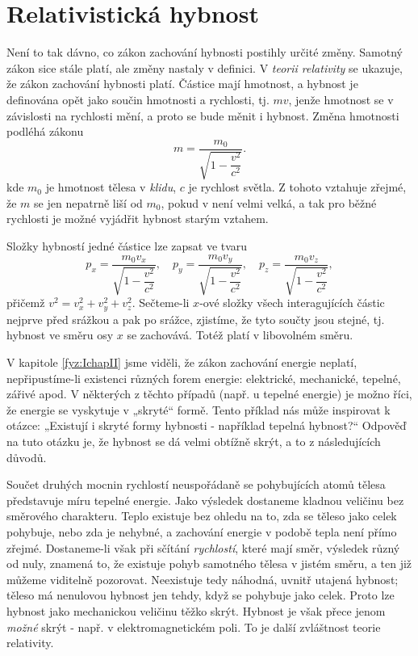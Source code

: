   \section{Relativistická hybnost}
    Není to tak dávno, co zákon zachování hybnosti postihly určité změny. Samotný zákon sice stále 
    platí, ale změny nastaly v definici. V \emph{teorii relativity} se ukazuje, že zákon zachování 
    hybnosti platí. Částice mají hmotnost, a hybnost je definována opět jako součin hmotnosti a 
    rychlosti, tj. \(mv\), jenže hmotnost se v závislosti na rychlosti mění, a proto se bude měnit 
    i hybnost. Změna hmotnosti podléhá zákonu
    \begin{equation}\label{fyz:eq143}
      m = \dfrac{m_0}{\sqrt{1 - \dfrac{v^2}{c^2}}}.
    \end{equation}
    kde \(m_0\) je hmotnost tělesa v \emph{klidu}, \(c\) je rychlost světla. Z tohoto vztahuje 
    zřejmé, že \(m\) se jen nepatrně liší od \(m_0\), pokud v není velmi velká, a tak pro běžné 
    rychlosti je možné vyjádřit hybnost starým vztahem.
    
    Složky hybností jedné částice lze zapsat ve tvaru
    \begin{equation}\label{fyz:eq144}
      p_x = \dfrac{m_0v_x}{\sqrt{1 - \dfrac{v^2}{c^2}}}, \quad
      p_y = \dfrac{m_0v_y}{\sqrt{1 - \dfrac{v^2}{c^2}}}, \quad
      p_z = \dfrac{m_0v_z}{\sqrt{1 - \dfrac{v^2}{c^2}}},
    \end{equation}
    přičemž \(v^2 = v_x^2 + v_y^2 + v_z^2\). Sečteme-li \(x\)-ové složky všech interagujících 
    částic nejprve před srážkou a pak po srážce, zjistíme, že tyto součty jsou stejné, tj. hybnost 
    ve směru osy \(x\) se zachovává. Totéž platí v libovolném směru.
    
    V kapitole \ref{fyz:IchapII} jsme viděli, že zákon zachování energie neplatí, nepřipustíme-li 
    existenci různých forem energie: elektrické, mechanické, tepelné, zářivé apod. V některých z 
    těchto případů (např. u tepelné energie) je možno říci, že energie se vyskytuje v „skryté“ 
    formě. Tento příklad nás může inspirovat k otázce: „Existují i skryté formy hybnosti - 
    například tepelná hybnost?“  Odpověď na tuto otázku je, že hybnost se dá velmi obtížně skrýt, a 
    to z následujících důvodů.
    
    Součet druhých mocnin rychlostí neuspořádaně se pohybujících atomů tělesa představuje míru 
    tepelné energie. Jako výsledek dostaneme kladnou veličinu bez směrového charakteru. Teplo 
    existuje bez ohledu na to, zda se těleso jako celek pohybuje, nebo zda je nehybné, a zachování 
    energie v podobě tepla není přímo zřejmé. Dostaneme-li však při sčítání \emph{rychlostí}, které 
    mají směr, výsledek různý od nuly, znamená to, že existuje pohyb samotného tělesa v jistém 
    směru, a ten již můžeme viditelně pozorovat. Neexistuje tedy náhodná, uvnitř utajená hybnost; 
    těleso má nenulovou hybnost jen tehdy, když se pohybuje jako celek. Proto lze hybnost jako 
    mechanickou veličinu těžko skrýt. Hybnost je však přece jenom \emph{možné} skrýt - např. v 
    elektromagnetickém poli. To je další zvláštnost teorie relativity.
    
